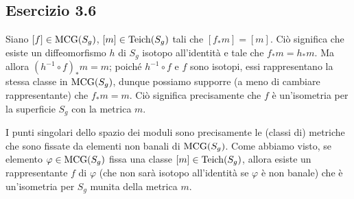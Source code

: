 \begin{figure}[h!]
\centering
{}
\end{figure}

\subsection*{Esercizio 3.6}
Siano $[f]\in\operatorname{MCG}(S_g)$, $[m]\in\operatorname{Teich}(S_g)$ tali che $[f_*m]=[m]$. Ciò significa che esiste un diffeomorfismo $h$ di $S_g$ isotopo all'identità e tale che $f_*m=h_*m$. Ma allora $(h^{-1}\circ f)_*m=m$; poiché $h^{-1}\circ f$ e $f$ sono isotopi, essi rappresentano la stessa classe in $\operatorname{MCG}(S_g)$, dunque possiamo supporre (a meno di cambiare rappresentante) che $f_*m=m$. Ciò significa precisamente che $f$ è un'isometria per la superficie $S_g$ con la metrica $m$.

I punti singolari dello spazio dei moduli sono precisamente le (classi di) metriche che sono fissate da elementi non banali di $\operatorname{MCG}(S_g)$. Come abbiamo visto, se elemento $\varphi\in\operatorname{MCG}(S_g)$ fissa una classe $[m]\in\operatorname{Teich}(S_g)$, allora esiste un rappresentante $f$ di $\varphi$ (che non sarà isotopo all'identità se $\varphi$ è non banale) che è un'isometria per $S_g$ munita della metrica $m$.